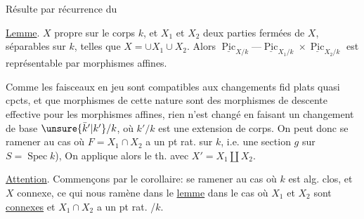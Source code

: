 Résulte par récurrence  du

\uline{Lemme}. $X$  propre sur le corps $k$, et  $X_1$ et $X_2$ deux parties fermées de $X$, séparables sur $k$, telles que $X=\cup X_1\cup X_2$. Alors $\underline{\operatorname{Pic}}_{X/k}\text{---}\underline{\operatorname{Pic}}_{X_1/k}\times\underline{\operatorname{Pic}}_{X_2/k}$ est représentable par morphismes affines.

Comme les faisceaux en jeu sont compatibles  aux changements fid plats quasi cpcts, et que  morphismes de cette nature sont des morphismes de descente effective pour les morphismes affines, rien n'est changé en faisant un changement de base $\unsure{\bar k'|k'}/k$, où $k'/k$ est une extension de corps. On peut donc se ramener au cas où $F=X_1\cap X_2$ a un pt rat. sur $k$, i.e. une section $g$ sur $S=\operatorname{Spec}k$), On applique alors le th. avec $X'=X_1\amalg X_2$.


\uline{Attention}. Commençons par le corollaire: se ramener au cas où $k$ est alg. clos, et $X$ connexe, ce qui nous ramène dans le \uline{lemme} dans le cas où $X_1$ et $X_2$ sont \uline{connexes} et $X_1\cap X_2$ a un pt rat. /$k$. 

